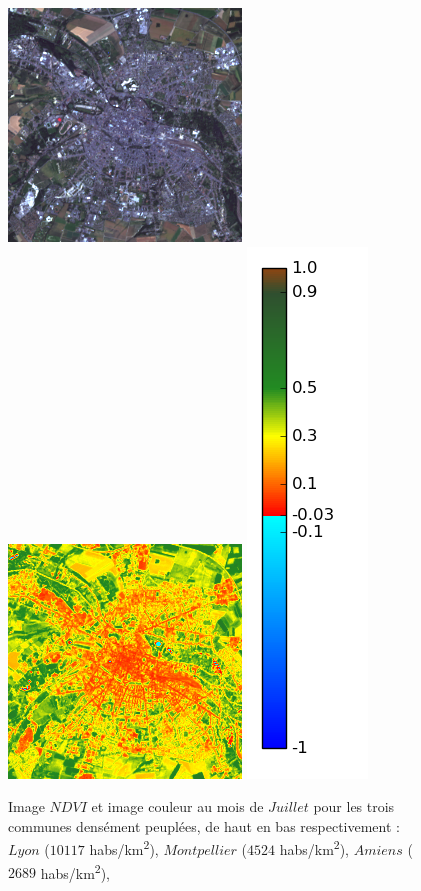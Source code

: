 \documentclass{book}
\begin{document}
\begin{figure}[H]
{}
\centerline{
\includegraphics[scale=0.6]{images/Amiens/07_rgb.png}
\includegraphics[scale=0.6]{images/Amiens/07_ndvi.png}
\includegraphics[scale=0.3]{images/colormap.png}
}
\caption{Image $NDVI$ et image couleur au mois de $Juillet$ pour les trois communes densément peuplées, de haut en bas respectivement :
$Lyon$ ($10117$ habs/km\textsuperscript{2}),
$Montpellier$ ($4524$ habs/km\textsuperscript{2}),
$Amiens$ ($2689$ habs/km\textsuperscript{2}),
}
\label{ndvi_cat1}
\end{figure}
\clearpage
\end{document}
